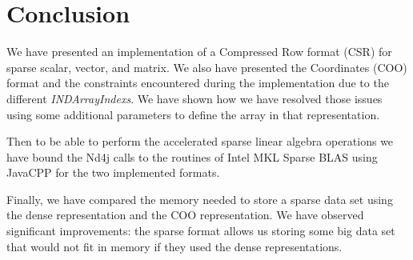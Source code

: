 \chapter{Conclusion}
 
 
 We have presented an implementation of a Compressed Row format (CSR) for sparse scalar, vector, and matrix. We also have presented the Coordinates (COO) format and the constraints encountered during the implementation due to the different \textit{INDArrayIndexs}. We have shown how we have resolved those issues using some additional parameters to define the array in that representation.
 
 Then to be able to perform the accelerated sparse linear algebra operations we have bound the Nd4j calls to the routines of Intel MKL Sparse BLAS using JavaCPP for the two implemented formats.
 
 Finally, we have compared the memory needed to store a sparse data set using the dense representation and the COO representation. We have observed significant improvements: the sparse format allows us storing some big data set that would not fit in memory if they used the dense representations. 